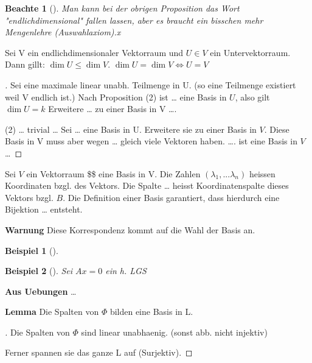 \documentclass[11pt]{article}
\newtheorem{exa}{Beispiel}[section]
\newtheorem*{notte}{Beachte}
\begin{document}
\begin{notte}[] \label{}
Man kann bei der obrigen Proposition das Wort "endlichdimensional" fallen
lassen, aber es braucht ein bisschen mehr Mengenlehre (Auswahlaxiom).x
\end{notte}


\begin{theo}{}{}
Sei V ein endlichdimensionaler Vektorraum und \(U\in V\) ein Untervektorraum. Dann
gillt: \(\dim U \leq \dim V\).  \(\dim U = \dim V \iff U=V\)
\end{theo}

\begin{proof}[] \label{}
Sei eine maximale linear unabh. Teilmenge in U. (so eine Teilmenge existiert
weil V endlich ist.)
Nach Proposition (2) ist \ldots{} eine Basis in \(U\), also gilt \(\dim U = k\) Erweitere
\ldots{} zu einer Basis in V \ldots{}. 

(2) \ldots{} trivial \ldots{} Sei \ldots{} eine Basis in U. Erweitere sie zu einer Basis in
\(V\). Diese Basis in V muss aber wegen \ldots{} gleich viele Vektoren haben. \ldots{}. ist
eine Basis in \(V\) \ldots{}
\end{proof}


\begin{definition}{}{}
Sei \(V\) ein Vektorraum \$\$ eine Basis in V. Die Zahlen \((\lambda_1,...\lambda_n)\)
heissen Koordinaten bzgl. des Vektors. Die Spalte \ldots{} heisst Koordinatenspalte
dieses Vektors bzgl. \(B\).
Die Definition einer Basis garantiert, dass hierdurch eine Bijektion \ldots{} entsteht.
\end{definition}

\textbf{Warnung} Diese Korrespondenz kommt auf die Wahl der Basis an.

\begin{exa}[] \label{}

\end{exa}

\begin{exa}[] \label{}
Sei \(Ax=0\) ein h. LGS
\end{exa}

\textbf{Aus Uebungen} \ldots{}

\textbf{Lemma} Die Spalten von \(\Phi\) bilden eine Basis in L.
\begin{proof}[] \label{}
Die Spalten von \(\Phi\) sind linear unabhaenig. (sonst abb. nicht injektiv)

Ferner spannen sie das ganze L auf (Surjektiv). 
\end{proof}
\end{document}
